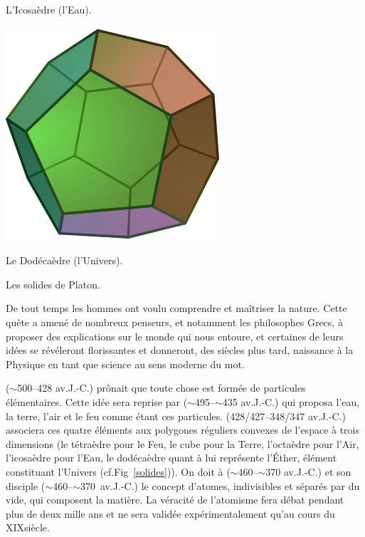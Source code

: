 {\captionsetup{type=subfigure}\caption{L'Icosaèdre (l'Eau).}
\includegraphics[width=0.25\marginparwidth]{SM/Dodecahedron.png}
\captionsetup{type=subfigure}\caption{Le Dodécaèdre (l'Univers).}
\captionsetup{type=figure}\caption{Les solides de Platon.}
\label{solides}
}
De tout temps les hommes ont voulu comprendre et maîtriser la nature. Cette quête a amené de nombreux penseurs, et notamment les philosophes Grecs, à proposer des explications sur le monde qui nous entoure, et certaines de leurs idées se révéleront florissantes et donneront, des siècles plus tard, naissance à la Physique en tant que science au sens moderne du mot. 

 ($\sim$\num{500}--\num{428} av.J.-C.) prônait que toute chose est formée de particules élémentaires. Cette idée sera reprise par  ($\sim$\num{495}--$\sim$\num{435} av.J.-C.) qui proposa l'eau, la terre, l'air et le feu comme étant ces particules.  (\num{428}/\num{427}--\num{348}/\num{347} av.J.-C.) associera ces quatre éléments aux polygones réguliers convexes de l'espace à trois dimensions (le tétraèdre pour le Feu, le cube pour la Terre, l'octaèdre pour l'Air, l'icosaèdre pour l'Eau, le dodécaèdre quant à lui représente l'Éther, élément constituant l'Univers (cf.Fig~\ref{solides})). On doit à  ($\sim$\num{460}--$\sim$\num{370} av.J.-C.) et son disciple  \hbox{($\sim$\num{460}--$\sim$\num{370} av.J.-C.)} le concept d'atomes, indivisibles et séparés par du vide, qui composent la matière. La véracité de l'atomisme fera débat pendant plus de deux mille ans et ne sera validée expérimentalement qu'au cours du XIX\ieme siècle.


